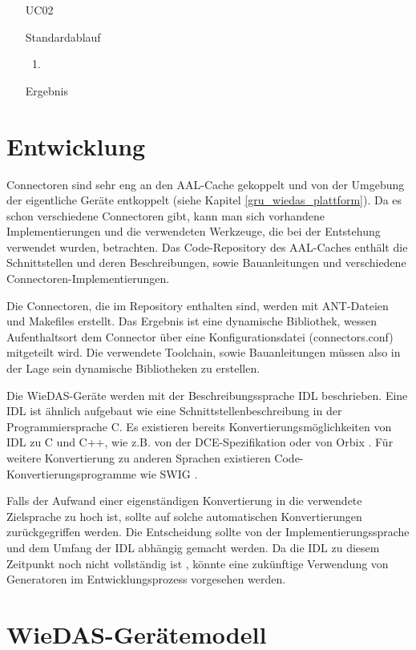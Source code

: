 \begin{itemize}
\item[UC02]
\item[Standardablauf]
 \begin{enumerate}
 \item
 \end{enumerate}
\item[Ergebnis]
\end{itemize}

\section{Entwicklung}
\label{ana_sw}

Connectoren sind sehr eng an den AAL-Cache gekoppelt und von der Umgebung der eigentliche Geräte
entkoppelt (siehe Kapitel \ref{gru_wiedas_plattform}).
Da es schon verschiedene Connectoren gibt, kann man sich vorhandene Implementierungen und die
verwendeten Werkzeuge, die bei der Entstehung verwendet wurden, betrachten.
Das Code-Repository des AAL-Caches enthält die Schnittstellen und deren Beschreibungen, sowie
Bauanleitungen und verschiedene Connectoren-Implementierungen.

Die Connectoren, die im Repository enthalten sind, werden mit ANT-Dateien und Makefiles erstellt.
Das Ergebnis ist eine dynamische Bibliothek, wessen Aufenthaltsort dem Connector über eine
Konfigurationsdatei (connectors.conf) mitgeteilt wird.
Die verwendete Toolchain, sowie Bauanleitungen müssen also in der Lage sein dynamische Bibliotheken
zu erstellen.

Die WieDAS-Geräte werden mit der Beschreibungssprache IDL beschrieben.
Eine IDL ist ähnlich aufgebaut wie eine Schnittstellenbeschreibung in der Programmiersprache C.
Es existieren bereits Konvertierungsmöglichkeiten von IDL zu C und C++, wie z.B. von der
DCE-Spezifikation \cite{cde} oder von Orbix \cite{orbix}.
Für weitere Konvertierung zu anderen Sprachen existieren Code-Konvertierungsprogramme wie SWIG \cite{swig}.

Falls der Aufwand einer eigenständigen Konvertierung in die verwendete Zielsprache zu hoch ist, sollte
auf solche automatischen Konvertierungen zurückgegriffen werden.
Die Entscheidung sollte von der Implementierungssprache und dem Umfang der IDL abhängig gemacht werden.
Da die IDL zu diesem Zeitpunkt noch nicht vollständig ist \cite{wiedas_onto},
könnte eine zukünftige Verwendung von Generatoren im Entwicklungsprozess vorgesehen werden.

\section{WieDAS-Gerätemodell}
\label{ana_wd_modell}

